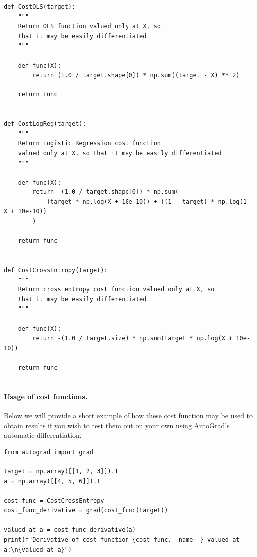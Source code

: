 \documentclass[%
oneside,                 %
final,                   %
10pt]{article}
\begin{document}
\begin{verbatim}
def CostOLS(target):
    """
    Return OLS function valued only at X, so
    that it may be easily differentiated
    """

    def func(X):
        return (1.0 / target.shape[0]) * np.sum((target - X) ** 2)

    return func


def CostLogReg(target):
    """
    Return Logistic Regression cost function
    valued only at X, so that it may be easily differentiated
    """

    def func(X):
        return -(1.0 / target.shape[0]) * np.sum(
            (target * np.log(X + 10e-10)) + ((1 - target) * np.log(1 - X + 10e-10))
        )

    return func


def CostCrossEntropy(target):
    """
    Return cross entropy cost function valued only at X, so
    that it may be easily differentiated
    """
    
    def func(X):
        return -(1.0 / target.size) * np.sum(target * np.log(X + 10e-10))

    return func


\end{verbatim}


\paragraph{Usage of cost functions.}
Below we will provide a short example of how these cost function may
be used to obtain results if you wish to test them out on your own
using AutoGrad's automatic differentiation.












\begin{verbatim}
from autograd import grad

target = np.array([[1, 2, 3]]).T
a = np.array([[4, 5, 6]]).T

cost_func = CostCrossEntropy
cost_func_derivative = grad(cost_func(target))

valued_at_a = cost_func_derivative(a)
print(f"Derivative of cost function {cost_func.__name__} valued at a:\n{valued_at_a}")

\end{verbatim}
\end{document}
